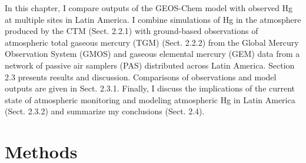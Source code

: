 \begin{flushleft}
 In this chapter, I compare outputs of the GEOS-Chem model with observed Hg at multiple sites in Latin America. I combine simulations of Hg in the atmosphere produced by the \gc CTM (Sect. 2.2.1) with ground-based observations of atmospheric total gaseous mercury (TGM) (Sect. 2.2.2) from the Global Mercury Observation System (GMOS)\cite{sprovieri_atmospheric_2016} and gaseous elemental mercury (GEM) data from a network of passive air samplers (PAS) distributed across Latin America. Section 2.3 presents results and discussion\cite{quant_measuring_2021}. Comparisons of observations and model outputs are given in Sect. 2.3.1. Finally, I discuss the implications of the current state of atmospheric monitoring and modeling atmospheric Hg in Latin America (Sect. 2.3.2) and summarize my conclusions (Sect. 2.4).
\end{flushleft}




\section{Methods}
